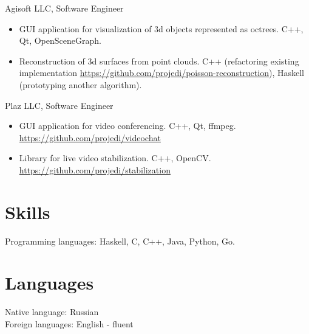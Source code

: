    Agisoft LLC, Software Engineer
   \begin{itemize}
      \itemsep 0cm
      \item GUI application for visualization of 3d objects represented as octrees.
            C++, Qt, OpenSceneGraph.
      \item Reconstruction of 3d surfaces from point clouds.
            C++ (refactoring existing implementation
            \url{https://github.com/projedi/poisson-reconstruction}),
            Haskell (prototyping another algorithm).
   \end{itemize}
   Plaz LLC, Software Engineer
   \begin{itemize}
      \itemsep 0cm
      \item GUI application for video conferencing. C++, Qt, ffmpeg.\\
            \url{https://github.com/projedi/videochat}
      \item Library for live video stabilization. C++, OpenCV.\\
            \url{https://github.com/projedi/stabilization}
   \end{itemize}

\section*{Skills}

Programming languages: Haskell, C, C++, Java, Python, Go.

\section*{Languages}
Native language: Russian\\
Foreign languages: English - fluent
